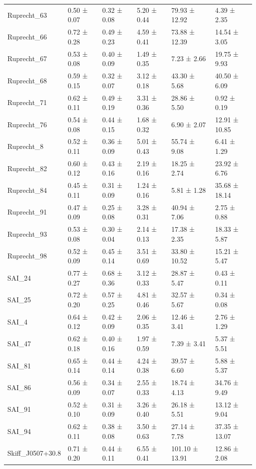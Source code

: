 \begin{tabular}{llllll}
Ruprecht_63 & 0.50 ± 0.07 & 0.32 ± 0.08 & 5.20 ± 0.44 & 79.93 ± 12.92 & 4.39 ± 2.35 \\
Ruprecht_66 & 0.72 ± 0.28 & 0.49 ± 0.23 & 4.59 ± 0.41 & 73.88 ± 12.39 & 14.54 ± 3.05 \\
Ruprecht_67 & 0.53 ± 0.08 & 0.40 ± 0.09 & 1.49 ± 0.35 & 7.23 ± 2.66 & 19.75 ± 9.93 \\
Ruprecht_68 & 0.59 ± 0.15 & 0.32 ± 0.07 & 3.12 ± 0.18 & 43.30 ± 5.68 & 40.50 ± 6.09 \\
Ruprecht_71 & 0.62 ± 0.11 & 0.49 ± 0.19 & 3.31 ± 0.36 & 28.86 ± 5.50 & 0.92 ± 0.19 \\
Ruprecht_76 & 0.54 ± 0.08 & 0.44 ± 0.15 & 1.68 ± 0.32 & 6.90 ± 2.07 & 12.91 ± 10.85 \\
Ruprecht_8 & 0.52 ± 0.11 & 0.36 ± 0.09 & 5.01 ± 0.43 & 55.74 ± 9.08 & 6.41 ± 1.29 \\
Ruprecht_82 & 0.60 ± 0.12 & 0.43 ± 0.16 & 2.19 ± 0.16 & 18.25 ± 2.74 & 23.92 ± 6.76 \\
Ruprecht_84 & 0.45 ± 0.11 & 0.31 ± 0.09 & 1.24 ± 0.16 & 5.81 ± 1.28 & 35.68 ± 18.14 \\
Ruprecht_91 & 0.47 ± 0.09 & 0.25 ± 0.08 & 3.28 ± 0.31 & 40.94 ± 7.06 & 2.75 ± 0.88 \\
Ruprecht_93 & 0.53 ± 0.08 & 0.30 ± 0.04 & 2.14 ± 0.13 & 17.38 ± 2.35 & 18.33 ± 5.87 \\
Ruprecht_98 & 0.52 ± 0.09 & 0.45 ± 0.14 & 3.51 ± 0.69 & 33.80 ± 10.52 & 15.21 ± 5.47 \\
SAI_24 & 0.77 ± 0.27 & 0.68 ± 0.36 & 3.12 ± 0.33 & 28.87 ± 5.47 & 0.43 ± 0.11 \\
SAI_25 & 0.72 ± 0.20 & 0.57 ± 0.25 & 4.81 ± 0.46 & 32.57 ± 5.67 & 0.34 ± 0.08 \\
SAI_4 & 0.64 ± 0.12 & 0.42 ± 0.09 & 2.06 ± 0.35 & 12.46 ± 3.41 & 2.76 ± 1.29 \\
SAI_47 & 0.62 ± 0.18 & 0.40 ± 0.16 & 1.97 ± 0.59 & 7.39 ± 3.41 & 5.37 ± 5.51 \\
SAI_81 & 0.65 ± 0.14 & 0.44 ± 0.14 & 4.24 ± 0.38 & 39.57 ± 6.60 & 5.88 ± 5.37 \\
SAI_86 & 0.56 ± 0.09 & 0.34 ± 0.07 & 2.55 ± 0.33 & 18.74 ± 4.13 & 34.76 ± 9.49 \\
SAI_91 & 0.52 ± 0.10 & 0.31 ± 0.09 & 3.26 ± 0.40 & 26.18 ± 5.51 & 13.12 ± 9.04 \\
SAI_94 & 0.62 ± 0.11 & 0.38 ± 0.08 & 3.50 ± 0.63 & 27.14 ± 7.78 & 37.35 ± 13.07 \\
Skiff_J0507+30.8 & 0.71 ± 0.20 & 0.44 ± 0.11 & 6.55 ± 0.41 & 101.10 ± 13.91 & 12.86 ± 2.08 \\

\end{tabular}

